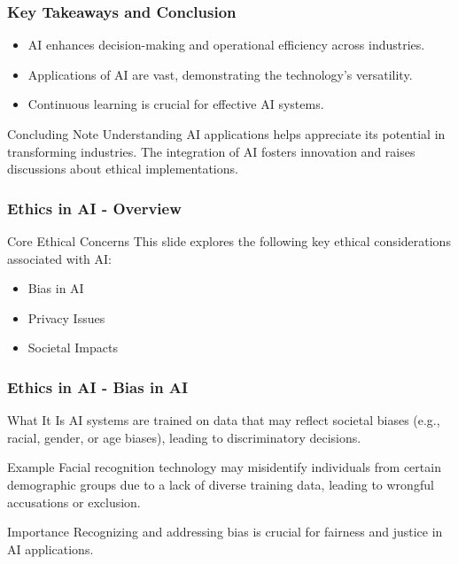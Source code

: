 \documentclass{beamer}
\begin{document}
\begin{frame}[fragile]
    \frametitle{Key Takeaways and Conclusion}
    \begin{itemize}
        \item AI enhances decision-making and operational efficiency across industries.
        \item Applications of AI are vast, demonstrating the technology's versatility.
        \item Continuous learning is crucial for effective AI systems.
    \end{itemize}
    
    \begin{block}{Concluding Note}
        Understanding AI applications helps appreciate its potential in transforming industries.
        The integration of AI fosters innovation and raises discussions about ethical implementations.
    \end{block}
\end{frame}

\begin{frame}[fragile]
    \frametitle{Ethics in AI - Overview}
    \begin{block}{Core Ethical Concerns}
        This slide explores the following key ethical considerations associated with AI:
        \begin{itemize}
            \item Bias in AI
            \item Privacy Issues
            \item Societal Impacts
        \end{itemize}
    \end{block}
\end{frame}

\begin{frame}[fragile]
    \frametitle{Ethics in AI - Bias in AI}
    \begin{block}{What It Is}
        AI systems are trained on data that may reflect societal biases (e.g., racial, gender, or age biases), leading to discriminatory decisions.
    \end{block}
    \begin{block}{Example}
        Facial recognition technology may misidentify individuals from certain demographic groups due to a lack of diverse training data, leading to wrongful accusations or exclusion.
    \end{block}
    \begin{block}{Importance}
        Recognizing and addressing bias is crucial for fairness and justice in AI applications.
    \end{block}
\end{frame}
\end{document}
